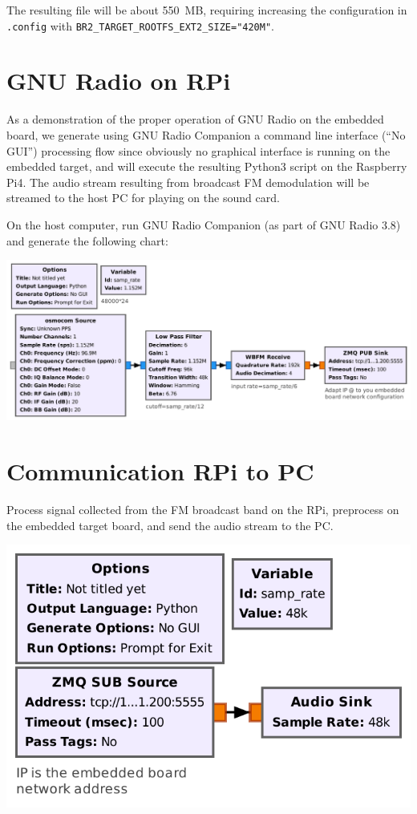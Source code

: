 \documentclass[a4paper]{article}
\begin{document}
The resulting file will be about 550~MB, requiring increasing the configuration in {\tt .config}
with {\tt BR2\_TARGET\_ROOTFS\_EXT2\_SIZE="420M"}.

\section{GNU Radio on RPi}

As a demonstration of the proper operation of GNU Radio on the embedded board, we
generate using GNU Radio Companion a command line interface (``No GUI'') processing flow 
since obviously no graphical interface is running on the embedded target, and will execute 
the resulting Python3 script on the Raspberry Pi4. The audio stream resulting from broadcast
FM demodulation will be streamed to the host PC for playing on the sound card.

On the host computer, run GNU Radio Companion (as part of GNU Radio 3.8) and generate
the following chart:

\includegraphics[width=\linewidth]{target}

\section{Communication RPi to PC}

Process signal collected from the FM broadcast band on the RPi, preprocess
on the embedded target board, and send the audio stream to the PC.

\begin{center}
\includegraphics[width=.5\linewidth]{host}
\end{center}
\end{document}
